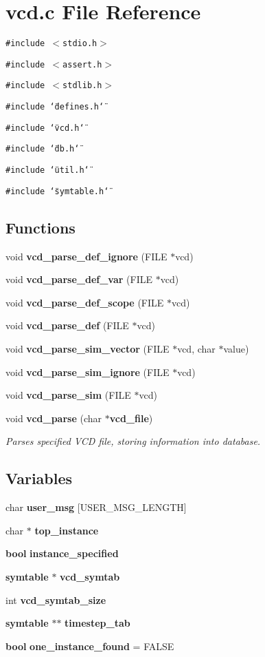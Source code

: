 \section{vcd.c File Reference}
\label{vcd_8c}
{\tt \#include $<$stdio.h$>$}\par
{\tt \#include $<$assert.h$>$}\par
{\tt \#include $<$stdlib.h$>$}\par
{\tt \#include \char`\"{}defines.h\char`\"{}}\par
{\tt \#include \char`\"{}vcd.h\char`\"{}}\par
{\tt \#include \char`\"{}db.h\char`\"{}}\par
{\tt \#include \char`\"{}util.h\char`\"{}}\par
{\tt \#include \char`\"{}symtable.h\char`\"{}}\par
\subsection*{Functions}
\begin{CompactItemize}
\item 
void {\bf vcd\_\-parse\_\-def\_\-ignore} (FILE $\ast$vcd)
\item 
void {\bf vcd\_\-parse\_\-def\_\-var} (FILE $\ast$vcd)
\item 
void {\bf vcd\_\-parse\_\-def\_\-scope} (FILE $\ast$vcd)
\item 
void {\bf vcd\_\-parse\_\-def} (FILE $\ast$vcd)
\item 
void {\bf vcd\_\-parse\_\-sim\_\-vector} (FILE $\ast$vcd, char $\ast$value)
\item 
void {\bf vcd\_\-parse\_\-sim\_\-ignore} (FILE $\ast$vcd)
\item 
void {\bf vcd\_\-parse\_\-sim} (FILE $\ast$vcd)
\item 
void {\bf vcd\_\-parse} (char $\ast${\bf vcd\_\-file})
\begin{CompactList}\small\item\em Parses specified VCD file, storing information into database. \item\end{CompactList}\end{CompactItemize}
\subsection*{Variables}
\begin{CompactItemize}
\item 
char {\bf user\_\-msg} [USER\_\-MSG\_\-LENGTH]
\item 
char $\ast$ {\bf top\_\-instance}
\item 
{\bf bool} {\bf instance\_\-specified}
\item 
{\bf symtable} $\ast$ {\bf vcd\_\-symtab}
\item 
int {\bf vcd\_\-symtab\_\-size}
\item 
{\bf symtable} $\ast$$\ast$ {\bf timestep\_\-tab}
\item 
{\bf bool} {\bf one\_\-instance\_\-found} = FALSE
\end{CompactItemize}


